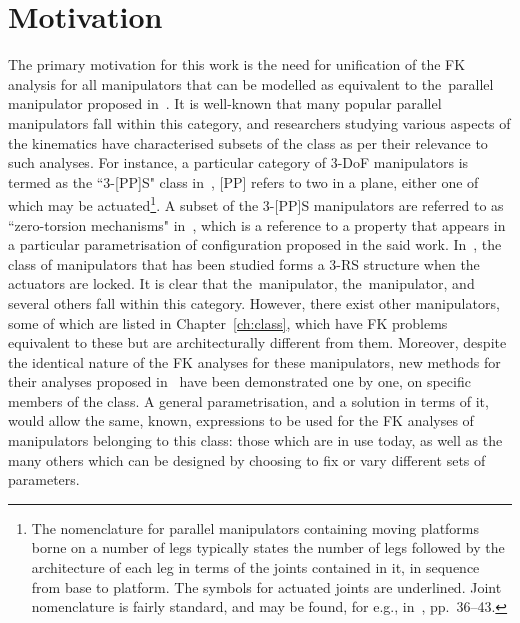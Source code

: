 \documentclass[DD]{iitmdiss}
\newcommand{\mref}[1]{\ref{#1}}
\newcommand{\mcite}[1]{\cite{#1}}
\begin{document}
\section{Motivation}
%
The primary motivation for this work is the need for unification of the FK analysis for all manipulators that can be modelled as equivalent to the~\rps parallel manipulator proposed in~\mcite{hunt1978}. It is well-known that many popular parallel manipulators fall within this category, and researchers studying various aspects of the kinematics have characterised subsets of the class as per their relevance to such analyses. For instance, a particular category of 3-DoF manipulators is termed as the ``3-[PP]S" class in~\mcite{bonev2008, nayak2018b}, [PP] refers to two \dofs in a plane, either one of which may be actuated\footnote{The nomenclature for parallel manipulators containing moving platforms borne on a number of legs typically states the number of legs followed by the architecture of each leg in terms of the joints contained in it, in sequence from base to platform. The symbols for actuated joints are underlined. Joint nomenclature is fairly standard, and may be found, for e.g., in~\mcite{ghosalbook}, pp.~36--43.}. A subset of the 3-[PP]S manipulators are referred to as ``zero-torsion mechanisms" in~\mcite{bonev2008}, which is a reference to a property that appears in a particular parametrisation of configuration proposed in the said work. In~\mcite{kong2018}, the class of manipulators that has been studied forms a 3-RS structure when the actuators are locked. It is clear that the~\rps manipulator, the~\rrs manipulator, and several others fall within this category. However, there exist other manipulators, some of which are listed in Chapter~\mref{ch:class}, which have FK problems equivalent to these but are architecturally different from them. Moreover, despite the identical nature of the FK analyses for these manipulators, new methods for their analyses proposed in~\mcite{tk2017a, pavanddp, kong2018} have been demonstrated one by one, on specific members of the class. A general parametrisation, and a solution in terms of it, would allow the same, known, expressions to be used for the FK analyses of manipulators belonging to this class: those which are in use today, as well as the many others which can be designed by choosing to fix or vary different sets of parameters.\\
\end{document}
